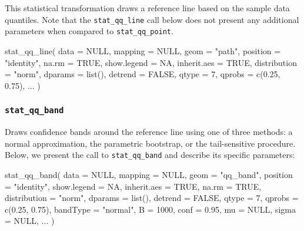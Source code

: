 This statistical transformation draws a reference line based on the
sample data quantiles. Note that the \texttt{stat\_qq\_line} call below
does not present any additional parameters when compared to
\texttt{stat\_qq\_point}.

\begin{Schunk}
\begin{Sinput}
stat_qq_line(
  data = NULL,
  mapping = NULL,
  geom = "path",
  position = "identity",
  na.rm = TRUE,
  show.legend = NA,
  inherit.aes = TRUE,
  distribution = "norm",
  dparams = list(),
  detrend = FALSE,
  qtype = 7,
  qprobs = c(0.25, 0.75),
  ...
  )
\end{Sinput}
\end{Schunk}

\subsubsection{\texorpdfstring{\texttt{stat\_qq\_band}}{stat\_qq\_band}}\label{stat_qq_band}

Draws confidence bands around the reference line using one of three
methods: a normal approximation, the parametric bootstrap, or the
tail-sensitive procedure. Below, we present the call to
\texttt{stat\_qq\_band} and describe its specific parameters:

\begin{Schunk}
\begin{Sinput}
stat_qq_band(
  data = NULL,
  mapping = NULL,
  geom = "qq_band",
  position = "identity",
  show.legend = NA,
  inherit.aes = TRUE,
  na.rm = TRUE,
  distribution = "norm",
  dparams = list(),
  detrend = FALSE,
  qtype = 7,
  qprobs = c(0.25, 0.75),
  bandType = "normal",
  B = 1000,
  conf = 0.95,
  mu = NULL,
  sigma = NULL,
  ...
  )
\end{Sinput}
\end{Schunk}

